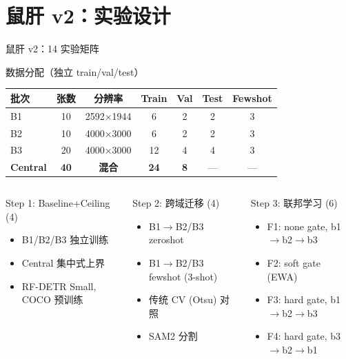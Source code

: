 \documentclass[aspectratio=169, 10pt]{beamer}
\begin{document}
\section{鼠肝 v2：实验设计}

\begin{frame}{鼠肝 v2：14 实验矩阵}
  \begin{block}{数据分配（独立 train/val/test）}
    \begin{tabular}{lcccccc}
      \toprule
      \textbf{批次} & \textbf{张数} & \textbf{分辨率} & \textbf{Train} & \textbf{Val} & \textbf{Test} & \textbf{Fewshot} \\
      \midrule
      B1 & 10 & 2592$\times$1944 & 6 & 2 & 2 & 3 \\
      B2 & 10 & 4000$\times$3000 & 6 & 2 & 2 & 3 \\
      B3 & 20 & 4000$\times$3000 & 12 & 4 & 4 & 3 \\
      \textbf{Central} & \textbf{40} & \textbf{混合} & \textbf{24} & \textbf{8} & — & — \\
      \bottomrule
    \end{tabular}
  \end{block}
  \vspace{0em}
  \begin{columns}[T]
    \begin{block}{Step 1: Baseline+Ceiling (4)}
      \begin{itemize}
        \item B1/B2/B3 独立训练
        \item Central 集中式上界
        \item RF-DETR Small, COCO 预训练
      \end{itemize}
    \end{block}
    \begin{block}{Step 2: 跨域迁移 (4)}
      \begin{itemize}
        \item B1$\to$B2/B3 zeroshot
        \item B1$\to$B2/B3 fewshot (3-shot)
        \item 传统 CV (Otsu) 对照
        \item SAM2 分割
      \end{itemize}
    \end{block}
    \begin{block}{Step 3: 联邦学习 (6)}
      \begin{itemize}
        \item F1: none gate, b1$\to$b2$\to$b3
        \item F2: soft gate (EWA)
        \item F3: hard gate, b1$\to$b2$\to$b3
        \item F4: hard gate, b3$\to$b2$\to$b1
      \end{itemize}
    \end{block}
  \end{columns}
\end{frame}
\end{document}
